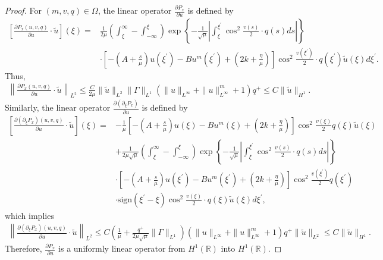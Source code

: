 \documentclass[10pt]{article}
\numberwithin{equation}{section}
\begin{document}
\begin{proof}
		For $(m,v,q)\in\Omega$, the linear operator $\frac{\partial P_x}{\partial u}$ is defined by
		\begin{align*}
			\left[\frac{\partial P_{x}(u,v,q)}{\partial u}\cdot\widetilde{u}\right](\xi) =&\frac{1}{2\mu}\left(\int_{\xi}^{\infty}-\int_{-\infty}^{\xi}\right)\exp\left\{-\frac{1}{\sqrt{\mu}}\left|\int_{\xi}^{\xi^{\prime}}\cos^{2}\frac{v(s)}{2}\cdot q(s)ds\right|\right\} \\
			& \cdot\left[-(A+\frac{s}{\mu})u(\xi^{\prime})-Bu^{m}(\xi^{\prime})+(2k+\frac{\eta}{\mu})\right]\cos^2\frac{v(\xi^{\prime})}{2}\cdot q(\xi^{\prime})\widetilde{u}(\xi)d\xi^{\prime}.
		\end{align*}
		Thus, 
		\begin{align*}
			\left\|\frac{\partial P_{x}(u,v,q)}{\partial u}\cdot\widetilde{u}\right\|_{L^2} \leq\frac{C}{2\mu}\|\widetilde{u}\|_{L^2}\|\Gamma\|_{L^1} \left(\|u\|_{L^\infty}+\|u\|_{L^\infty}^m+1\right)q^+\leq C\|\widetilde{u}\|_{H^1}.
		\end{align*}
		Similarly, the linear operator $\frac{\partial (\partial_{\xi}P_x)}{\partial u}$ is defined by
		\begin{align*}
			\left[\frac{\partial (\partial_{\xi}P_x)(u,v,q)}{\partial u}\cdot\widetilde{u}\right](\xi) =&-\frac{1}{\mu}\left[-(A+\frac{s}{\mu})u(\xi)-Bu^{m}(\xi)+(2k+\frac{\eta}{\mu})\right]\cos^2\frac{v(\xi)}{2}q(\xi)\widetilde{u}(\xi) \\
			& +\frac{1}{2\mu\sqrt{\mu}}\left(\int_{\xi}^{\infty}-\int_{-\infty}^{\xi}\right)\exp\left\{-\frac{1}{\sqrt{\mu}}\left|\int_{\xi}^{\xi^{\prime}}\cos^{2}\frac{v(s)}{2}\cdot q(s)ds\right|\right\} \\
			& \cdot\left[-(A+\frac{s}{\mu})u(\xi^{\prime})-Bu^{m}(\xi^{\prime})+(2k+\frac{\eta}{\mu})\right]\cos^2\frac{v(\xi^{\prime})}{2}q(\xi^{\prime})\\
			&
			\cdot\mathrm{sign}(\xi^{\prime}-\xi)\cos^2\frac{v(\xi)}{2}\cdot q(\xi)\widetilde{u}(\xi)d\xi^{\prime},
		\end{align*}
		which implies 
		\begin{align*}
			\left\|\frac{\partial (\partial_{\xi}P_x)(u,v,q)}{\partial u}\cdot\widetilde{u}\right\|_{L^2} \leq C\left(\frac{1}{\mu}+\frac{q^+}{2\mu\sqrt{\mu}}\|\Gamma\|_{L^1}\right) \left(\|u\|_{L^\infty}+\|u\|_{L^\infty}^m+1\right)q^+\|\widetilde{u}\|_{L^2}\leq C\|\widetilde{u}\|_{H^1}.
		\end{align*}
		Therefore, $\frac{\partial P_x}{\partial u}$ is a uniformly linear operator from $H^1(\mathbb{R})$ into $H^1(\mathbb{R})$. 
		

\end{proof}
\end{document}
